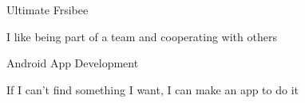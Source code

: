 \begin{cventries}
  \cventry
    {}
    {Ultimate Frsibee}
    {}
    {}
    {
      \begin{cvitems}
        \item {I like being part of a team and cooperating with others}
      \end{cvitems}
    }

    \cventry
      {}
      {Android App Development}
      {}
      {}
      {
        \begin{cvitems}
          \item {If I can't find something I want, I can make an app to do it}
        \end{cvitems}
      }

\end{cventries}
